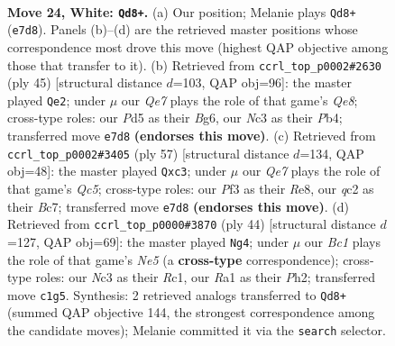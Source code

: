 \documentclass[11pt]{article}
\begin{document}
\clearpage

\begin{figure}[p]\centering
\begin{subfigure}{0.46\textwidth}\centering
\resizebox{\linewidth}{!}{%
\newchessgame
\chessboard[
  setfen={r1b3k1/ppppQpp1/1b1n3p/3P4/6B1/2N2P1P/PPq3P1/R1B2K2 w - - 0 24},
  showmover=false,
  pgfstyle=straightmove, color=movearrow, markmove={e7-d8}
]}
\caption{}
\end{subfigure}\hfill
\begin{subfigure}{0.46\textwidth}\centering
\resizebox{\linewidth}{!}{%
\newchessgame
\chessboard[
  setfen={6k1/3r1ppp/pQ1b2b1/8/1pP3n1/3P2P1/PPB2P1P/1RB1qNK1 b - - 6 23},
  showmover=false,
  pgfstyle=straightmove, color=movearrow, markmove={e1-e2}
]}
\caption{}
\end{subfigure}
\\[4pt]
\begin{subfigure}{0.46\textwidth}\centering
\resizebox{\linewidth}{!}{%
\newchessgame
\chessboard[
  setfen={4r1k1/2bb2pp/4pp2/p1Pp4/P1qP1N1P/2P1BQ2/5PP1/4R1K1 b - - 5 29},
  showmover=false,
  pgfstyle=straightmove, color=movearrow, markmove={c4-c3}
]}
\caption{}
\end{subfigure}\hfill
\begin{subfigure}{0.46\textwidth}\centering
\resizebox{\linewidth}{!}{%
\newchessgame
\chessboard[
  setfen={r5k1/pb3ppp/1p1qpb2/3nN3/Q2P4/P4B2/1P1B1PPP/2R3K1 w - - 5 23},
  showmover=false,
  pgfstyle=straightmove, color=movearrow, markmove={e5-g4}
]}
\caption{}
\end{subfigure}
\caption{\textbf{Move 24, White: \texttt{Qd8+}.} (a) Our position; Melanie plays \texttt{Qd8+} (\texttt{e7d8}). Panels (b)--(d) are the retrieved master positions whose correspondence most drove this move (highest QAP objective among those that transfer to it). (b) Retrieved from \texttt{ccrl\_top\_p0002\#2630} (ply 45) [structural distance $d$=103, QAP obj=96]: the master played \texttt{Qe2}; under $\mu$ our \emph{Qe7} plays the role of that game's \emph{Qe8}; cross-type roles: our \emph{P}d5 as their \emph{B}g6, our \emph{N}c3 as their \emph{P}b4; transferred move \texttt{e7d8} \textbf{(endorses this move)}. (c) Retrieved from \texttt{ccrl\_top\_p0002\#3405} (ply 57) [structural distance $d$=134, QAP obj=48]: the master played \texttt{Qxc3}; under $\mu$ our \emph{Qe7} plays the role of that game's \emph{Qc5}; cross-type roles: our \emph{P}f3 as their \emph{R}e8, our \emph{q}c2 as their \emph{B}c7; transferred move \texttt{e7d8} \textbf{(endorses this move)}. (d) Retrieved from \texttt{ccrl\_top\_p0000\#3870} (ply 44) [structural distance $d$=127, QAP obj=69]: the master played \texttt{Ng4}; under $\mu$ our \emph{Bc1} plays the role of that game's \emph{Ne5} (a \textbf{cross-type} correspondence); cross-type roles: our \emph{N}c3 as their \emph{R}c1, our \emph{R}a1 as their \emph{P}h2; transferred move \texttt{c1g5}. Synthesis: 2 retrieved analogs transferred to \texttt{Qd8+} (summed QAP objective 144, the strongest correspondence among the candidate moves); Melanie committed it via the \texttt{search} selector.}
\label{fig:thought-m46}
\end{figure}
\end{document}
